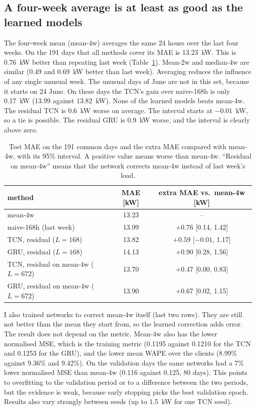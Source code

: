 \documentclass[10pt,a4paper]{article}
\begin{document}
\subsection{A four-week average is at least as good as the learned models}\label{sec:mean4}
The four-week mean (mean-4w) averages the same 24 hours over the last four weeks. On the 191 days that all methods cover its MAE is 13.23~kW. This is 0.76~kW better than repeating last week (Table~\ref{tab:mean4}). Mean-2w and median-4w are similar (0.49 and 0.69~kW better than last week). Averaging reduces the influence of any single unusual week. The unusual days of June are not in this set, because it starts on 24 June. On these days the TCN's gain over naive-168h is only 0.17~kW (13.99 against 13.82~kW). None of the learned models beats mean-4w. The residual TCN is 0.6~kW worse on average. The interval starts at $-0.01$~kW, so a tie is possible. The residual GRU is 0.9~kW worse, and the interval is clearly above zero.

\begin{table}[!ht]
\centering\footnotesize
\caption{Test MAE on the 191 common days and the extra MAE compared with mean-4w, with its 95\% interval. A positive value means worse than mean-4w. ``Residual on mean-4w'' means that the network corrects mean-4w instead of last week's load.}\label{tab:mean4}
\begin{tabular}{@{}lcc@{}}
\toprule
method & MAE [kW] & extra MAE vs.\ mean-4w [kW]\\
\midrule
mean-4w                                & 13.23 & --\\
naive-168h (last week)                 & 13.99 & $+0.76$ [0.14, 1.42]\\
TCN, residual ($L=168$)                & 13.82 & $+0.59$ [$-0.01$, 1.17]\\
GRU, residual ($L=168$)                & 14.13 & $+0.90$ [0.28, 1.56]\\
TCN, residual on mean-4w ($L=672$)     & 13.70 & $+0.47$ [0.00, 0.83]\\
GRU, residual on mean-4w ($L=672$)     & 13.90 & $+0.67$ [0.02, 1.15]\\
\bottomrule
\end{tabular}
\end{table}

I also trained networks to correct mean-4w itself (last two rows). They are still not better than the mean they start from, so the learned correction adds error. The result does not depend on the metric. Mean-4w also has the lower normalised MSE, which is the training metric (0.1195 against 0.1210 for the TCN and 0.1253 for the GRU), and the lower mean WAPE over the clients (8.99\% against 9.36\% and 9.42\%). On the validation days the same networks had a 7\% lower normalised MSE than mean-4w (0.116 against 0.125, 80 days). This points to overfitting to the validation period or to a difference between the two periods, but the evidence is weak, because early stopping picks the best validation epoch. Results also vary strongly between seeds (up to 1.5~kW for one TCN seed).
\end{document}
